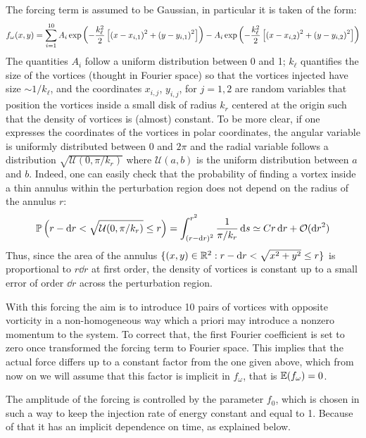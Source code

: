 \documentclass[../main.tex]{subfiles}
\begin{document}
The forcing term is assumed to be Gaussian, in particular it is taken of the form:
\begin{equation}
	f_\omega(x,y) = \sum_{i=1}^{10} A_i \operatorname{exp}\left(-\frac{k_\ell^2}{2}\left[{(x-x_{i,1})}^2 + {(y-y_{i,1})}^2\right]\right) - A_i\operatorname{exp}\left(-\frac{k_\ell^2}{2}\left[{(x-x_{i,2})}^2 + {(y-y_{i,2})}^2\right]\right)
\end{equation}
The quantities $A_i$ follow a uniform distribution between 0 and 1; $k_\ell$ quantifies the size of the vortices (thought in Fourier space) so that the vortices injected have size $\sim 1/k_\ell$, and the coordinates $x_{i,j}$, $y_{i,j}$, for $j=1,2$ are random variables that position the vortices inside a small disk of radius $k_r$ centered at the origin such that the density of vortices is (almost) constant. To be more clear, if one expresses the coordinates of the vortices in polar coordinates, the angular variable is uniformly distributed between 0 and $2\pi$ and the radial variable follows a distribution $\sqrt{\mathcal{U}(0,\pi/k_r)}$ where $\mathcal{U}(a,b)$ is the uniform distribution between $a$ and $b$. Indeed, one can easily check that the probability of finding a vortex inside a thin annulus within the perturbation region does not depend on the radius of the annulus $r$:
\begin{equation}
	\mathbb{P}\left(r-\dd{r} < \sqrt{\mathcal{U}(0,\pi/k_r)} \leq r\right) = \int_{{(r-\dd{r})}^2}^{r^2} \frac{1}{\pi/k_r} \dd{s} \simeq C r \dd{r} + \mathcal{O}(\dd{r}^2)
\end{equation}
Thus, since the area of the annulus $\{(x,y) \in \mathbb{R}^2 : r-\dd{r} < \sqrt{x^2+y^2} \leq r\}$ is proportional to $r \dd{r}$ at first order, the density of vortices is constant up to a small error of order $\dd{r}$ across the perturbation region.

With this forcing the aim is to introduce 10 pairs of vortices with opposite vorticity in a non-homogeneous way which a priori may introduce a nonzero momentum to the system. To correct that, the first Fourier coefficient is set to zero once transformed the forcing term to Fourier space. This implies that the actual force differs up to a constant factor from the one given above, which from now on we will assume that this factor is implicit in $f_\omega$, that is $\mathbb{E}(f_\omega) = 0$.

The amplitude of the forcing is controlled by the parameter $f_0$, which is chosen in such a way to keep the injection rate of energy constant and equal to 1. Because of that it has an implicit dependence on time, as explained below.
\end{document}
